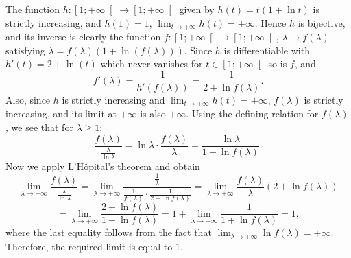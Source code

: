 \begin{solution}
    The function \( h : \left[1;+\infty\right[ \rightarrow \left[1;+\infty\right[ \) given by \( h\left(t\right) = t\left(1 + \ln t\right) \) is strictly increasing, and \( h\left(1\right) = 1 \), \( \lim_{t \to +\infty} h\left(t\right) = +\infty \). Hence \( h \) is bijective, and its inverse is clearly the function \( f : \left[1;+\infty\right[ \rightarrow \left[1;+\infty\right[ \), \( \lambda \rightarrow f\left(\lambda\right) \) satisfying \( \lambda=f\left(\lambda\right)\left(1+\ln\left(f\left(\lambda\right)\right)\right) \). Since \( h \) is differentiable with \( h'\left(t\right)=2+\ln\left(t\right) \) which never vanishes for \( t\in\left[1;+\infty\right[ \) so is \( f \), and
    \[
        f'\left(\lambda\right) = \frac{1}{h'\left(f\left(\lambda\right)\right)} = \frac{1}{2 + \ln f\left(\lambda\right)}.
    \]
    Also, since \( h \) is strictly increasing and \( \lim_{t \to +\infty} h\left(t\right) = +\infty \), \( f\left(\lambda\right) \) is strictly increasing, and its limit at \( +\infty \) is also \( +\infty \). Using the defining relation for \( f\left(\lambda\right) \), we see that for \( \lambda \geq 1 \):
    \[
        \frac{f\left(\lambda\right)}{\frac{\lambda}{\ln \lambda}} = \ln \lambda \cdot \frac{f\left(\lambda\right)}{\lambda} = \frac{\ln \lambda}{1 + \ln f\left(\lambda\right)}.
    \]
    Now we apply L'Hôpital's theorem and obtain
    \[
        \lim_{\lambda \to +\infty} \frac{f\left(\lambda\right)}{\frac{\lambda}{\ln \lambda}} = \lim_{\lambda \to +\infty} \frac{\frac{1}{\lambda}}{\frac{1}{f\left(\lambda\right)} \cdot \frac{1}{2 + \ln f\left(\lambda\right)}} = \lim_{\lambda \to +\infty} \frac{f\left(\lambda\right)}{\lambda} \left(2 + \ln
        f\left(\lambda\right)\right)\]
    \[
        = \lim_{\lambda \to +\infty} \frac{2 + \ln f\left(\lambda\right)}{1 + \ln f\left(\lambda\right)} = 1+\lim_{\lambda \to +\infty}\frac{1}{1+\ln f\left(\lambda\right)}=1,
    \]
    where the last equality follows from the fact that \( \lim_{\lambda\to +\infty}\ln f\left(\lambda\right)=+\infty \). Therefore, the required limit is equal to \( 1 \).
\end{solution}
